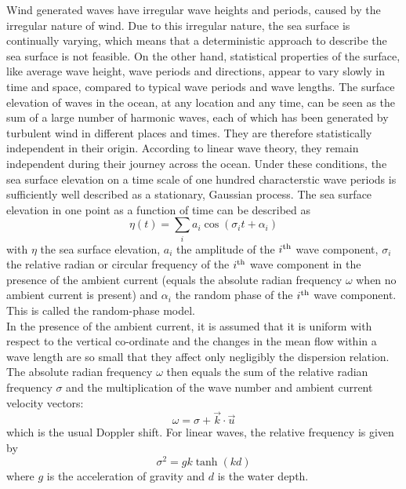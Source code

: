 \documentclass[12pt]{book}
\begin{document}
Wind generated waves have irregular wave heights and periods, caused by the irregular
nature of wind. Due to this irregular nature, the sea surface is continually varying,
which means that a deterministic approach to describe the sea surface is not feasible.
On the other hand, statistical properties of the surface, like average wave
height, wave periods and directions, appear to vary slowly in time and space, compared
to typical wave periods and wave lengths.
The surface elevation of waves in the ocean, at any location and any time,
can be seen as the sum of a large number of harmonic waves, each of which has been
generated by turbulent wind in different places and times. They are therefore
statistically independent in their origin. According to linear wave theory, they remain
independent during their journey across the ocean. Under these conditions, the sea
surface elevation on a time scale of one hundred characterstic wave periods is sufficiently
well described as a stationary, Gaussian process. The sea surface elevation in one point as
a function of time can be described as
\begin{equation}
  \eta (t) = \sum_i a_i \cos (\sigma_i t + {\alpha}_i)
  \label{intro1}
\end{equation}
with $\eta$ the sea surface elevation, $a_i$ the amplitude of the $i^{\rm th}$ wave component,
$\sigma_i$ the relative radian or circular frequency of the $i^{\rm th}$ wave component in the
presence of the ambient current (equals the absolute radian frequency $\omega$ when no ambient
current is present) and ${\alpha}_i$ the random phase of the $i^{\rm th}$ wave component.
This is called the random-phase model.
\\[2ex]
\noindent
In the presence of the ambient current, it is assumed that it is uniform with respect to the vertical
co-ordinate and the changes in the mean flow within a wave length are so small that they affect only
negligibly the dispersion relation. The absolute radian frequency $\omega$ then equals the sum of
the relative radian frequency $\sigma$ and the multiplication of the wave number and ambient current
velocity vectors:
\begin{equation}
  \omega = \sigma + \vec{k} \cdot \vec{u}
  \label{intro2}
\end{equation}
which is the usual Doppler shift. For linear waves, the relative frequency is given by
\begin{equation}
  \sigma^2 = gk \tanh (kd)
  \label{intro3}
\end{equation}
where $g$ is the acceleration of gravity and $d$ is the water depth.
\end{document}
